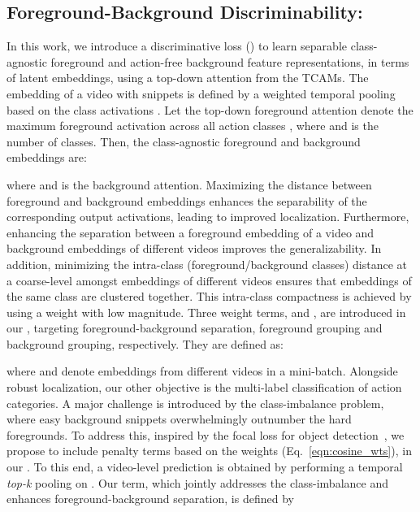 \documentclass[final]{cvpr}
\begin{document}
\subsection{\hspace{-0.07em}Foreground-Background Discriminability:\label{sec:integrated_loss}}
In this work, we introduce a discriminative loss () to learn separable class-agnostic foreground and action-free background feature representations, in terms of latent embeddings, using a top-down attention from the TCAMs. 
The embedding of a video with  snippets is defined by a weighted temporal pooling based on the class activations .
Let the top-down foreground attention  denote the maximum foreground activation across all action classes , where  and  is the number of classes. Then, the class-agnostic foreground and background embeddings are:

where  and  is the background attention.
Maximizing the distance between foreground and background embeddings enhances the separability of the corresponding output activations, leading to improved localization.
Furthermore, enhancing the separation between a foreground embedding of a video and background embeddings of different videos improves the generalizability.
In addition, minimizing the intra-class (foreground/background classes) distance at a coarse-level amongst embeddings of different videos ensures that embeddings of the same class are clustered together.
This intra-class compactness is achieved by using a weight  with low magnitude. 
Three weight terms,  and , are introduced in our , targeting foreground-background separation, foreground grouping and background grouping, respectively. They are defined as: 

where  and  denote embeddings from different videos in a mini-batch. 
Alongside robust localization, our other objective is the multi-label classification of action categories. 
A major challenge is introduced by the class-imbalance problem, where easy background snippets overwhelmingly outnumber the hard foregrounds. 
To address this, inspired by the focal loss for object detection~\cite{focal_loss}, we propose to include penalty terms based on the weights (Eq.~\ref{eqn:cosine_wts}), in our .
To this end, a video-level prediction  is obtained by performing a temporal \emph{top-k} pooling on . Our  term, which jointly addresses the class-imbalance and enhances foreground-background separation, is defined by
\end{document}
